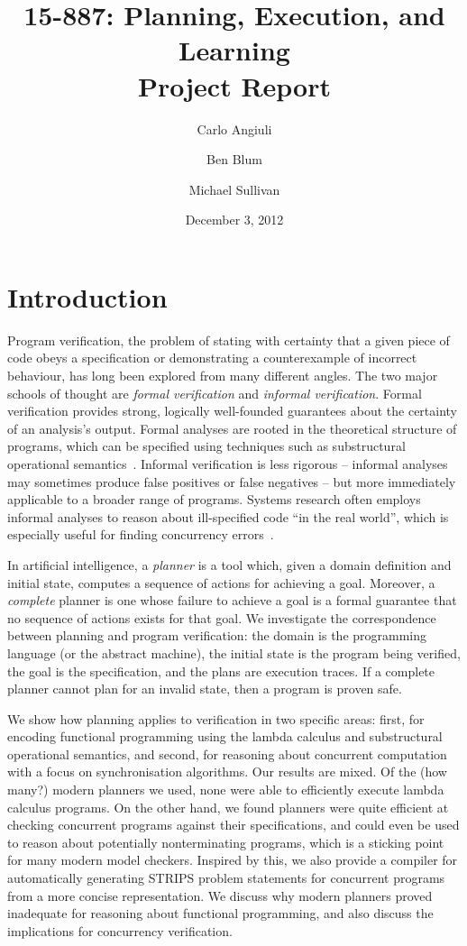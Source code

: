 \documentclass{article}
\title{
{\large 15-887: Planning, Execution, and Learning}\\
Project Report}
\author{Carlo Angiuli \and Ben Blum \and Michael Sullivan}
\date{December 3, 2012}
\begin{document}
\maketitle

\section{Introduction}

Program verification, the problem of stating with certainty that a given piece of code obeys a specification or demonstrating a counterexample of incorrect behaviour, has long been explored from many different angles.
The two major schools of thought are {\em formal verification} and {\em informal verification}.
Formal verification provides strong, logically well-founded guarantees about the certainty of an analysis's output.
Formal analyses are rooted in the theoretical structure of programs, which can be specified using techniques such as substructural operational semantics~\cite{rob}.
Informal verification is less rigorous -- informal analyses may sometimes produce false positives or false negatives -- but more immediately applicable to a broader range of programs.
Systems research often employs informal analyses to reason about ill-specified code ``in the real world'', which is especially useful for finding concurrency errors~\cite{ben}.

In artificial intelligence, a {\em planner} is a tool which, given a domain definition and initial state, computes a sequence of actions for achieving a goal.
Moreover, a {\em complete} planner is one whose failure to achieve a goal is a formal guarantee that no sequence of actions exists for that goal.
We investigate the correspondence between planning and program verification: the domain is the programming language (or the abstract machine), the initial state is the program being verified, the goal is the specification, and the plans are execution traces.
If a complete planner cannot plan for an invalid state, then a program is proven safe.

We show how planning applies to verification in two specific areas: first, for encoding functional programming using the lambda calculus and substructural operational semantics,
and second, for reasoning about concurrent computation with a focus on synchronisation algorithms.
Our results are mixed.
Of the (how many?) modern planners we used, none were able to efficiently execute lambda calculus programs. %
On the other hand, we found planners were quite efficient at checking concurrent programs against their specifications,
and could even be used to reason about potentially nonterminating programs, which is a sticking point for many modern model checkers. %
Inspired by this, we also provide a compiler for automatically generating STRIPS problem statements for concurrent programs from a more concise representation.
We discuss why modern planners proved inadequate for reasoning about functional programming, and also discuss the implications for concurrency verification.
\end{document}
